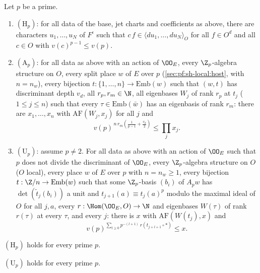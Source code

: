 \begin{definition}\label{pf:sh-local:def:three}
Let $p$ be a prime.
\begin{enumerate}[label=(\alph*)]
\item $(\mathrm H_p)$: for all data of the base, jet charts and coefficients as above, there are characters
$u_1,\dots,u_N$ of $F^\iota$ such that $c\,f\in\langle du_1,\dots,du_N\rangle_O$ for all $f\in O^d$ and all $c\in O$
with $v(c)^{p-1}\le v(p)$.
\item $(\mathrm A_p)$: for all data as above with an action of $\OO_E$, every $\Z_p$-algebra structure on $O$, every
split place $w$ of $E$ over $p$ (\cref{sec:pf:sh-local:host}, with $n=n_w$), every bijection
$t:\{1,\dots,n\}\to\mathrm{Emb}(w)$ such that $(w,t)$ has discriminant depth $v_d$, all $r_p,r_m\in\N$, all eigenbases
$W_j$ of rank $r_p$ at $t_j$ ($1\le j\le n$) such that every $\tau\in\mathrm{Emb}(\bar w)$ has an eigenbasis of rank
$r_m$: there are $x_1,\dots,x_n$ with $\mathrm{AF}(W_j,x_j)$ for all $j$ and
\[
v(p)^{\,n\,r_m\left(\frac1{p-1}+\frac{v_d}2\right)}\le\prod_jx_j .
\]
\item $(\mathrm U_p)$: assume $p\ne2$. For all data as above with an action of $\OO_E$ such that $p$ does not divide
the discriminant of $\OO_E$, every $\Z_p$-algebra structure on $O$ ($O$ local), every place $w$ of $E$ over $p$ with
$n=n_w\ge1$, every bijection $t:\Z/n\to\mathrm{Emb}(w)$ such that some $\Z_p$-basis $(b_i)$ of $A_pw$ has
$\det(\tilde t_j(b_i))$ a unit and $t_{j+1}(a)\equiv t_j(a)^p$ modulo the maximal ideal of $O$ for all $j,a$, every
$r:\Hom(\OO_E,O)\to\N$ and eigenbases $W(\tau)$ of rank $r(\tau)$ at every $\tau$, and every $j$: there is $x$ with
$\mathrm{AF}(W(t_j),x)$ and
\[
v(p)^{\sum_{l\ge0}p^{-(l+1)}\,r(t_{j+l+1}\circ*)}\le x .
\]
\end{enumerate}
\end{definition}

\begin{theorem}\label{pf:sh-local:Hp}
$(\mathrm H_p)$ holds for every prime $p$.
\end{theorem}

\begin{theorem}\label{pf:sh-local:Up}
$(\mathrm U_p)$ holds for every prime $p$.
\end{theorem}

